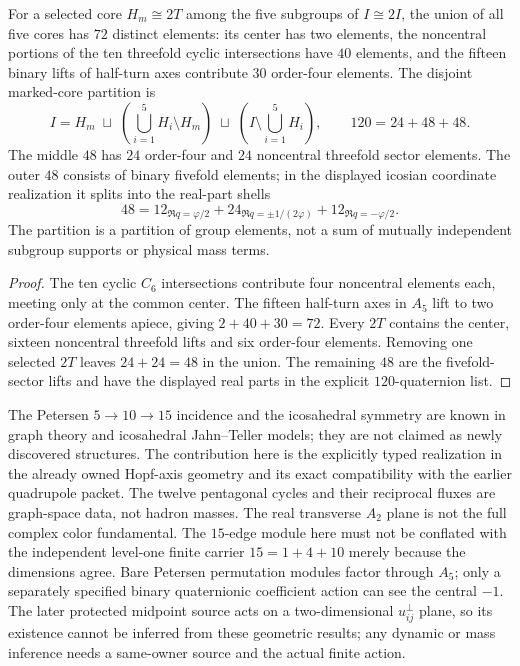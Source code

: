 \documentclass[11pt]{article}
\begin{document}
\begin{proposition}
\label{p1:prop:petersen-120-strata}
For a selected core $H_m\cong2T$ among the five subgroups of
$I\cong2I$, the union of all five cores has $72$ distinct elements:
its center has two elements, the noncentral portions of the ten
threefold cyclic intersections have $40$ elements, and the fifteen
binary lifts of half-turn axes contribute $30$ order-four elements.
The disjoint marked-core partition is
\[
 I=H_m\;\sqcup\;
 \left(\bigcup_{i=1}^5H_i\setminus H_m\right)
 \;\sqcup\;\left(I\setminus\bigcup_{i=1}^5H_i\right),
 \qquad 120=24+48+48.
\]
The middle $48$ has $24$ order-four and $24$ noncentral threefold
sector elements. The outer $48$ consists of binary fivefold elements;
in the displayed icosian coordinate realization it splits into the
real-part shells
\[
 48=12_{\Re q=\varphi/2}
    +24_{\Re q=\pm1/(2\varphi)}
    +12_{\Re q=-\varphi/2}.
\]
The partition is a partition of group elements, not a sum of
mutually independent subgroup supports or physical mass terms.
\end{proposition}
\begin{proof}
The ten cyclic $C_6$ intersections contribute four noncentral
elements each, meeting only at the common center. The fifteen
half-turn axes in $A_5$ lift to two order-four elements apiece,
giving $2+40+30=72$. Every $2T$ contains the center, sixteen
noncentral threefold lifts and six order-four elements. Removing one
selected $2T$ leaves $24+24=48$ in the union. The remaining $48$
are the fivefold-sector lifts and have the displayed real parts in
the explicit $120$-quaternion list.
\end{proof}

\begin{remark}
The Petersen $5\to10\to15$ incidence and the icosahedral symmetry
are known in graph theory and icosahedral Jahn--Teller models; they
are not claimed as newly discovered structures. The contribution here
is the explicitly typed realization in the already owned Hopf-axis
geometry and its exact compatibility with the earlier quadrupole
packet. The twelve pentagonal cycles and their reciprocal fluxes
are graph-space data, not hadron masses. The real transverse $A_2$
plane is not the full complex color fundamental. The $15$-edge
module here must not be conflated with the independent level-one
finite carrier $15=1+4+10$ merely because the dimensions agree. Bare Petersen
permutation modules factor through $A_5$; only a separately specified
binary quaternionic coefficient action can see the central $-1$.
The later protected midpoint source acts on a two-dimensional
$u_{ij}^{\perp}$ plane, so its existence cannot be inferred from
these geometric results; any dynamic or mass inference needs a
same-owner source and the actual finite action.
\end{remark}
\end{document}
